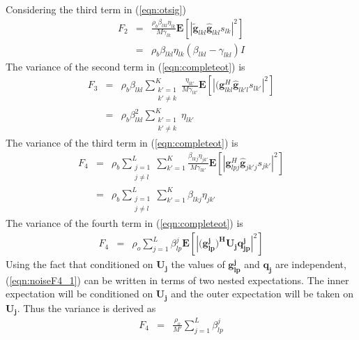 \documentclass[10pt, a4paper, twoside,fleqn]{article}
\begin{document}
Considering the third term in (\ref{eqn:otsig}) 
\begin{eqnarray}\label{eq:noiseF2}
	F_2 &=& \frac{\rho_b\beta_{lkl}\eta_{lk}}{M\gamma_{lk}} \pmb{E}[| \pmb{\widetilde{g}}_{lkl} \pmb{\hat g}_{lkl} s_{lk}|^2] \nonumber \\
	    &=&  \rho_b\beta_{lkl}\eta_{lk} (\beta_{lkl} - \gamma_{lkl})I 
\end{eqnarray}
The variance of the second term in (\ref{eqn:completeot}) is
\begin{eqnarray}\label{eq:noiseF3}
	F_3 &=& \rho_b\beta_{lkl}\sum_{\substack{k'=1 \\ k' \neq k}}^{K}\frac{\eta_{lk'}}{M\gamma_{lk'}} \pmb{E}[|(\pmb{g}^H_{lkl} \pmb{\hat g}_{lk'l} s_{lk'}|^2] \nonumber \\
	    &=&  \rho_b\beta_{lkl}^2\sum_{\substack{k'=1 \\ k' \neq k}}^{K}\eta_{lk'} 
\end{eqnarray}
The variance of the third term in (\ref{eqn:completeot}) is
\begin{eqnarray}\label{eqn:noiseF4}
	F_4 &=& \rho_b\sum_{\substack{j=1 \\j \neq l}}^{L} \sum_{k'=1}^{K} \frac{\beta_{lkj}\eta_{jk'}}{M\gamma_{lk'}} \pmb{E}\left[ |\pmb{g}^H_{lpj} \pmb{\hat g}_{jk'j} s_{jk'}|^2 \right] \nonumber \\
            &=&  \rho_b\sum_{\substack{j=1 \\j \neq l}}^{L} \sum_{k'=1}^{K} \beta_{lkj}\eta_{jk'}
\end{eqnarray}
The variance of the fourth term in (\ref{eqn:completeot}) is
\begin{eqnarray}\label{eqn:noiseF4_1}
	F_4 &=& \rho_o\sum_{j=1}^{L}\beta_{lp}^{j}\pmb{E}\left[|(\pmb{g_{lp}^{j})^HU_jq_{jp}^{j}}|^2\right] \nonumber
\end{eqnarray}
Using the fact that conditioned on $\pmb{U_j}$ the values of $\pmb{g_{lp}^{j}}$ and $\pmb{q_{j}}$ are independent, (\ref{eqn:noiseF4_1}) can be written in terms of two nested expectations. The inner expectation will be conditioned on $\pmb{U_j}$ and the outer expectation will be taken on  $\pmb{U_j}$. Thus the variance is derived as
\begin{eqnarray}\label{eqn:noiseF4}
	F_4 &=& \frac{\rho_o}{M'}\sum_{j=1}^{L}\beta_{lp}^{j}
\end{eqnarray}
\end{document}
